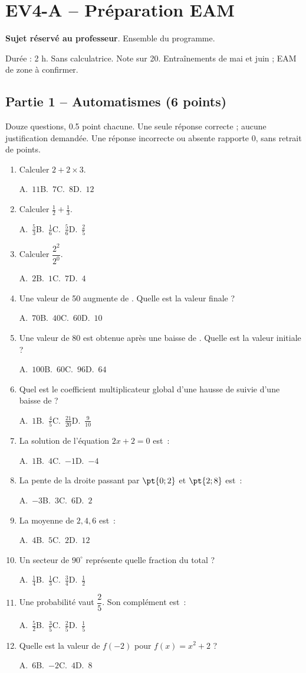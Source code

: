 \mxnewpage\section*{EV4-A -- Préparation EAM}\label{EV4-A}
\textbf{Sujet réservé au professeur}. Ensemble du programme.\par Durée : 2 h. Sans calculatrice. Note sur 20. Entraînements de mai et juin ; EAM de zone à confirmer.
\subsection*{Partie 1 -- Automatismes (6 points)}
Douze questions, \num{0,5} point chacune. Une seule réponse correcte ; aucune justification demandée. Une réponse incorrecte ou absente rapporte 0, sans retrait de points.
\begin{enumerate}
\item Calculer $2+2\times3$.\par A.~$11$\quad B.~$7$\quad C.~$8$\quad D.~$12$
\item Calculer $\frac12+\frac13$.\par A.~$\frac{5}{3}$\quad B.~$\frac{1}{6}$\quad C.~$\frac{5}{6}$\quad D.~$\frac{2}{5}$
\item Calculer $\dfrac{2^2}{2^{0}}$.\par A.~$2$\quad B.~$1$\quad C.~$7$\quad D.~$4$
\item Une valeur de 50 augmente de . Quelle est la valeur finale ?\par A.~$70$\quad B.~$40$\quad C.~$60$\quad D.~$10$
\item Une valeur de 80 est obtenue après une baisse de . Quelle est la valeur initiale ?\par A.~$100$\quad B.~$60$\quad C.~$96$\quad D.~$64$
\item Quel est le coefficient multiplicateur global d’une hausse de  suivie d’une baisse de  ?\par A.~$1$\quad B.~$\frac{4}{5}$\quad C.~$\frac{21}{20}$\quad D.~$\frac{9}{10}$
\item La solution de l’équation $2x+2=0$ est~:\par A.~$1$\quad B.~$4$\quad C.~$-1$\quad D.~$-4$
\item La pente de la droite passant par $\pt{0;2}$ et $\pt{2;8}$ est~:\par A.~$-3$\quad B.~$3$\quad C.~$6$\quad D.~$2$
\item La moyenne de $2, 4, 6$ est~:\par A.~$4$\quad B.~$5$\quad C.~$2$\quad D.~$12$
\item Un secteur de $90^\circ$ représente quelle fraction du total ?\par A.~$\frac{1}{4}$\quad B.~$\frac{1}{3}$\quad C.~$\frac{3}{4}$\quad D.~$\frac{1}{2}$
\item Une probabilité vaut $\dfrac{2}{5}$. Son complément est~:\par A.~$\frac{5}{2}$\quad B.~$\frac{3}{5}$\quad C.~$\frac{2}{5}$\quad D.~$\frac{1}{5}$
\item Quelle est la valeur de $f(-2)$ pour $f(x)=x^2+2$ ?\par A.~$6$\quad B.~$-2$\quad C.~$4$\quad D.~$8$
\end{enumerate}

